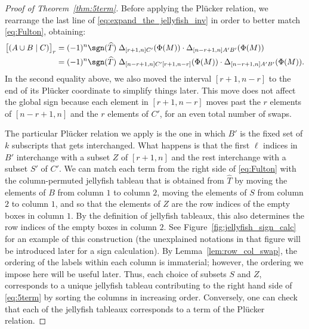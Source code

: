 \begin{proof}[Proof of Theorem~\ref{thm:5term}]
Before applying the Pl\"ucker relation, we rearrange the last line of \eqref{eq:expand_the_jellyfish_inv} in order to better match \eqref{eq:Fulton}, obtaining:
\begin{equation}\label{eq:expand_the_jellyfish_inv_some_more}
\begin{split}
        \big[(A\cup B \mid C)\big]_r 
        &= (-1)^n \sgn(\widehat{T}) \;   \Delta_{[r+1, n]  C'}(\Phi(M)) \cdot \Delta_{[n-r + 1, n]  A'B'}(\Phi(M)) \\
        &= (-1)^n \sgn(\widehat{T}) \;   \Delta_{[n-r+1, n]  C'  [r+1,n-r]}(\Phi(M)) \cdot \Delta_{[n-r + 1, n]  A' B'}(\Phi(M)). 
        \end{split}
        \end{equation}
In the second equality above, we also moved the interval $[r+1,n-r]$ to the end of its Pl\"ucker coordinate to simplify things later. This move does not affect the global sign because each element in $[r+1,n-r]$ moves past the $r$ elements of $[n-r+1,n]$ and the $r$ elements of $C'$, for an even total number of swaps.

The particular Pl\"ucker relation we apply is the one in which $B'$ is the fixed set of $k$ subscripts that gets interchanged. What happens is that the first $\ell$ indices in $B'$ interchange with a subset $Z$ of $[r+1,n]$ and the rest interchange with a subset $S'$ of $C'$. We can match each term from the right side of \eqref{eq:Fulton} with the column-permuted jellyfish tableau that is obtained from $\widehat{T}$ by moving the elements of $B$ from column $1$ to column $2$, moving the elements of $S$ from column $2$ to column $1$, and so that the elements of $Z$ are the row indices of the empty boxes in column $1$. By the definition of jellyfish tableaux, this also determines the row indices of the empty boxes in column $2$. See Figure~\ref{fig:jellyfish_sign_calc} for an example of this construction (the unexplained notations in that figure will be introduced later for a sign calculation). By Lemma~\ref{lem:row_col_swap}, the ordering of the labels within each column is immaterial; however, the ordering we impose here will be useful later. Thus, each choice of subsets $S$ and $Z$, corresponds to a unique jellyfish tableau contributing to the right hand side of \eqref{eq:5term} by sorting the columns in increasing order. Conversely, one can check that each of the jellyfish tableaux corresponds to a term of the Pl\"ucker relation.


\end{proof}
